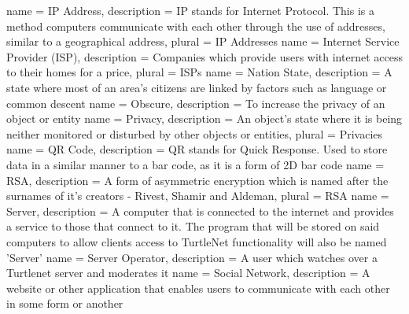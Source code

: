{
    name = IP Address,
    description = {IP stands for Internet Protocol.  This is a method computers
                   communicate with each other through the use of addresses,
                   similar to a geographical address},
    plural = IP Addresses
}
{
    name = Internet Service Provider (ISP),
    description = {Companies which provide users with internet access to their
                   homes for a price},
    plural = ISPs
}
{
    name = Nation State,
    description = {A state where most of an area's citizens are linked by
                   factors such as language or common descent}
}
{
    name = Obscure,
    description = {To increase the privacy of an object or entity}
}
{
    name = Privacy,
    description = {An object's state where it is being neither monitored or
                   disturbed by other objects or entities},
    plural = Privacies
}
{
    name = QR Code,
    description = {QR stands for Quick Response.  Used to store data in a 
                   similar manner to a bar code, as it is a form of 2D bar code}
}
{
    name = RSA,
    description = {A form of asymmetric encryption which is named after the surnames of it's creators - Rivest, Shamir and Aldeman},
    plural = RSA
}
{
    name = Server,
    description = {A computer that is connected to the internet and provides a
                   service to those that connect to it.  The program that will
                   be stored on said computers to allow clients access to
                   TurtleNet functionality will also be named 'Server'}
}
{
    name = Server Operator,
    description = {A user which watches over a Turtlenet server and moderates
                   it}
}
{
    name = Social Network,
    description = {A website or other application that enables users to 
                   communicate with each other in some form or another}
}
